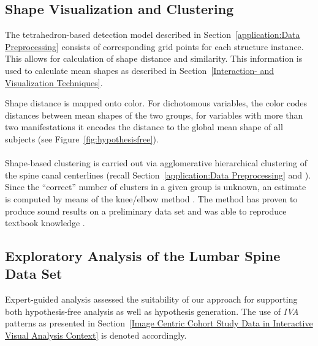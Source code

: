 \documentclass[journal]{style/vgtc} 			          %
\begin{document}
\subsection{Shape Visualization and Clustering}
%
The tetrahedron-based detection model described in Section~\ref{application:Data Preprocessing} consists of corresponding grid points for each structure instance.
%
This allows for calculation of shape distance and similarity.
%
This information is used to calculate mean shapes as described in Section~\ref{Interaction- and Visualization Techniques}.

Shape distance is mapped onto color.
%
For dichotomous variables, the color codes distances between mean shapes of the two groups, for variables with more than two manifestations it encodes the distance to the global mean shape of all subjects (see Figure~\ref{fig:hypothesisfree}).
\\\\
Shape-based clustering is carried out via agglomerative hierarchical clustering of the spine canal centerlines (recall Section~\ref{application:Data Preprocessing} and \cite{Klemm2013VMV}).
%
Since the ``correct'' number of clusters in a given group is unknown, an estimate is computed by means of the knee/elbow method \cite{Salvador2004}.
%
%
The method has proven to produce sound results on a preliminary data set and was able to reproduce textbook knowledge \cite{Klemm2013VMV}.

\subsection{Exploratory Analysis of the Lumbar Spine Data Set}
%
Expert-guided analysis assessed the suitability of our approach for supporting both hypothesis-free analysis as well as hypothesis generation. 
%
The use of \emph{IVA} patterns as presented in Section~\ref{Image Centric Cohort Study Data in Interactive Visual Analysis Context} is denoted accordingly.
%
\end{document}
